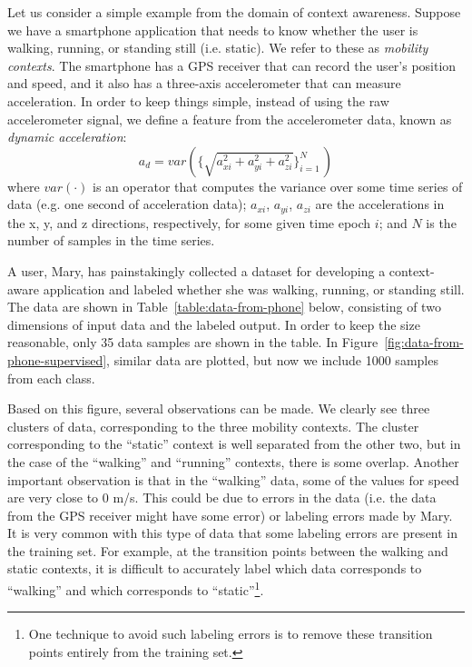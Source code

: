 Let us consider a simple example from the domain of context awareness. Suppose we have a smartphone application that needs to know whether the user is walking, running, or standing still (i.e. static). We refer to these as \emph{mobility contexts}. The smartphone has a GPS receiver that can record the user's position and speed, and it also has a three-axis accelerometer that can measure acceleration. In order to keep things simple, instead of using the raw accelerometer signal, we define a feature from the accelerometer data, known as \emph{dynamic acceleration}:
%
\begin{equation}
a_d = var(\{\sqrt{a_{xi}^2 + a_{yi}^2 + a_{zi}^2}\}_{i=1}^N\,)
\end{equation}
%
where $var(\cdot)$ is an operator that computes the variance over some time series of data (e.g. one second of acceleration data); $a_{xi}$, $a_{yi}$, $a_{zi}$ are the accelerations in the x, y, and z directions, respectively, for some given time epoch $i$; and $N$ is the number of samples in the time series.

A user, Mary, has painstakingly collected a dataset for developing a context-aware application and labeled whether she was walking, running, or standing still. The data are shown in Table~\ref{table:data-from-phone} below, consisting of two dimensions of input data and the labeled output. In order to keep the size reasonable, only 35 data samples are shown in the table. In Figure~\ref{fig:data-from-phone-supervised}, similar data are plotted, but now we include 1000 samples from each class.

Based on this figure, several observations can be made. We clearly see three clusters of data, corresponding to the three mobility contexts. The cluster corresponding to the ``static'' context is well separated from the other two, but in the case of the ``walking'' and ``running'' contexts, there is some overlap. Another important observation is that in the ``walking'' data, some of the values for speed are very close to 0 m/s. This could be due to errors in the data (i.e. the data from the GPS receiver might have some error) or labeling errors made by Mary. It is very common with this type of data that some labeling errors are present in the training set. For example, at the transition points between the walking and static contexts, it is difficult to accurately label which data corresponds to ``walking'' and which corresponds to ``static''\footnote{One technique to avoid such labeling errors is to remove these transition points entirely from the training set.}.

